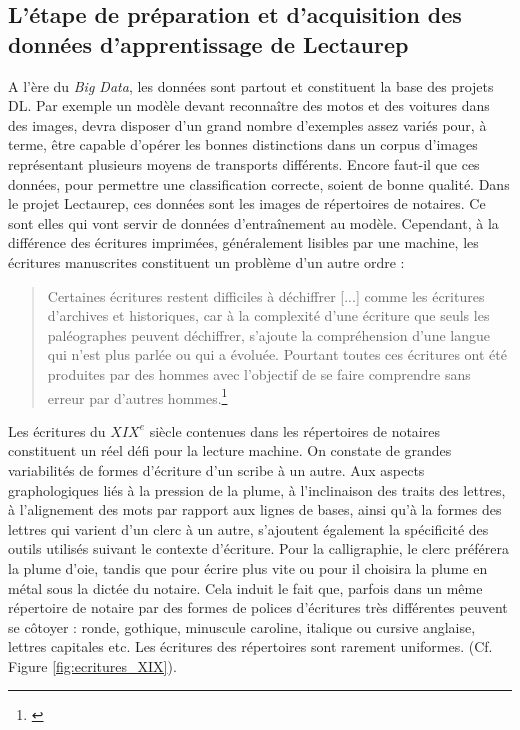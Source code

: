 \subsection{L'étape de préparation et d'acquisition des données d'apprentissage de Lectaurep}

A l'ère du \textit{Big Data}, les données sont partout et constituent la base des projets DL. Par exemple un modèle devant reconnaître des motos et des voitures dans des images, devra disposer d'un grand nombre d'exemples assez variés pour, à terme, être capable d'opérer les bonnes distinctions dans un corpus d'images représentant plusieurs moyens de transports différents. Encore faut-il que ces données, pour permettre une classification correcte, soient de bonne qualité. Dans le projet Lectaurep, ces données sont les images de répertoires de notaires. Ce sont elles qui vont servir de données d'entraînement au modèle. Cependant, à la différence des écritures imprimées, généralement lisibles par une machine, les écritures manuscrites constituent un problème d'un autre ordre : \\
\begin{quote}
    Certaines écritures restent difficiles à déchiffrer [...] comme les écritures d'archives et historiques, car à la complexité d'une écriture que seuls les paléographes peuvent déchiffrer, s'ajoute la compréhension d'une langue qui n'est plus parlée ou qui a évoluée. Pourtant toutes ces écritures ont été produites par des hommes avec l'objectif de se faire comprendre sans erreur par d'autres hommes.\footnote{\cite{kermorvant_reconnaissance_2019}}
\end{quote}
\newpage
Les écritures du $ XIX^{e}$ siècle contenues dans les répertoires de notaires constituent un réel défi pour la lecture machine. On constate de grandes variabilités de formes d'écriture d'un scribe à un autre. Aux aspects graphologiques liés à la pression de la plume, à l'inclinaison des traits des lettres, à l'alignement des mots par rapport aux lignes de bases, ainsi qu'à la formes des lettres qui varient d'un clerc à un autre, s'ajoutent également la spécificité des outils utilisés suivant le contexte d'écriture. Pour la calligraphie, le clerc préférera la plume d'oie, tandis que pour écrire plus vite ou pour  il choisira la plume en métal sous la dictée du notaire. Cela induit le fait que, parfois dans un même répertoire de notaire par des formes de polices d'écritures très différentes peuvent se côtoyer : ronde, gothique, minuscule caroline, italique ou cursive anglaise, lettres capitales etc. Les écritures des répertoires sont rarement uniformes. (Cf. Figure \ref{fig:ecritures_XIX}).
